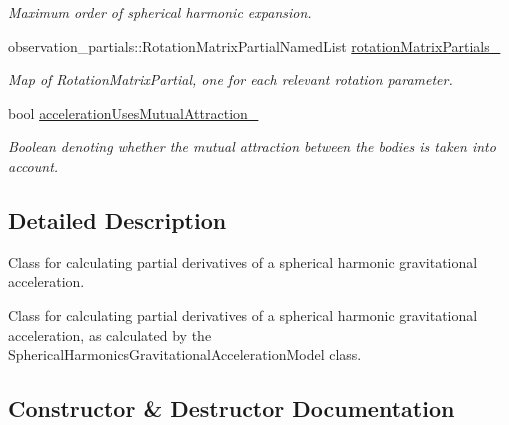 \begin{DoxyCompactItemize}
\begin{DoxyCompactList}\small\item\em Maximum order of spherical harmonic expansion. \end{DoxyCompactList}\item 
observation\+\_\+partials\+::\+Rotation\+Matrix\+Partial\+Named\+List \hyperlink{classtudat_1_1acceleration__partials_1_1SphericalHarmonicsGravityPartial_a66bd0af703babbf495b82ff1dfa88757}{rotation\+Matrix\+Partials\+\_\+}
\begin{DoxyCompactList}\small\item\em Map of Rotation\+Matrix\+Partial, one for each relevant rotation parameter. \end{DoxyCompactList}\item 
bool \hyperlink{classtudat_1_1acceleration__partials_1_1SphericalHarmonicsGravityPartial_aadf9b1035115c37289fb59d44eba2778}{acceleration\+Uses\+Mutual\+Attraction\+\_\+}
\begin{DoxyCompactList}\small\item\em Boolean denoting whether the mutual attraction between the bodies is taken into account. \end{DoxyCompactList}\end{DoxyCompactItemize}


\subsection{Detailed Description}
Class for calculating partial derivatives of a spherical harmonic gravitational acceleration. 

Class for calculating partial derivatives of a spherical harmonic gravitational acceleration, as calculated by the Spherical\+Harmonics\+Gravitational\+Acceleration\+Model class. 

\subsection{Constructor \& Destructor Documentation}
